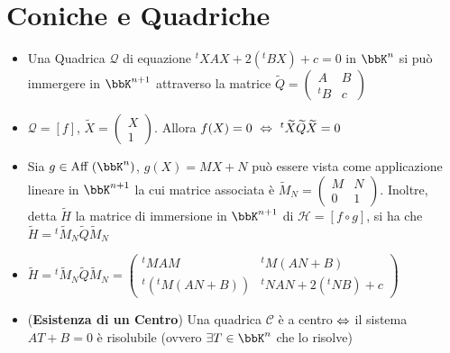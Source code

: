 \documentclass[a4paper,NoNotes,GeneralMath]{stdmdoc}
\begin{document}
	\section*{Coniche e Quadriche}
	\begin{itemize}
		\item Una Quadrica $\mathcal{Q}$ di equazione ${}^tXAX +2({}^tBX) +c = 0$ in $\bbK^n$ si può immergere in $\bbK^{n+1}$ attraverso la matrice $\widetilde{Q} = \left( \begin{array}{c|c} A & B \\ \hline {}^tB & c \end{array} \right) $
		\item $\mathcal{Q} = [f]$, $\widetilde{X} = \left(\begin{array}{c} X\\ \hline 1 \end{array} \right)$. Allora $f(X)= 0 \ \sse \ {}^t\widetilde{X}\widetilde{Q}\widetilde{X}=0$
		\item Sia $g \in \Aff(\bbK^n)$, $g(X) = MX + N$ può essere vista come applicazione lineare in $\bbK^{n+1}$ la cui matrice associata è $\widetilde{M}_N = \left(\begin	{array}	{c|c} M & N\\ \hline 0 & 1\end{array} \right)$.
		Inoltre, detta $\widetilde{H}$ la matrice di immersione in $\bbK^{n+1}$ di $\mathcal{H} = [f \circ g]$, si ha che $\widetilde{H} = {}^t\widetilde{M}_N\widetilde{Q}\widetilde{M}_N$
		\item $\widetilde{H} = {}^t\widetilde{M}_N\widetilde{Q}\widetilde{M}_N = \left( \begin{array}{c|c} {}^tMAM & {}^tM(AN + B)\\ \hline {}^t({}^tM(AN + B)) & {}^tNAN + 2({}^tNB) + c \end{array} \right)$
		\item ({\bf Esistenza di un Centro}) Una quadrica $\mathcal{C}$ è a centro $\Leftrightarrow$ il sistema $AT+B=0$ è risolubile (ovvero $\exists T \in \bbK^n$ che lo risolve)
	\end{itemize}
\end{document}

